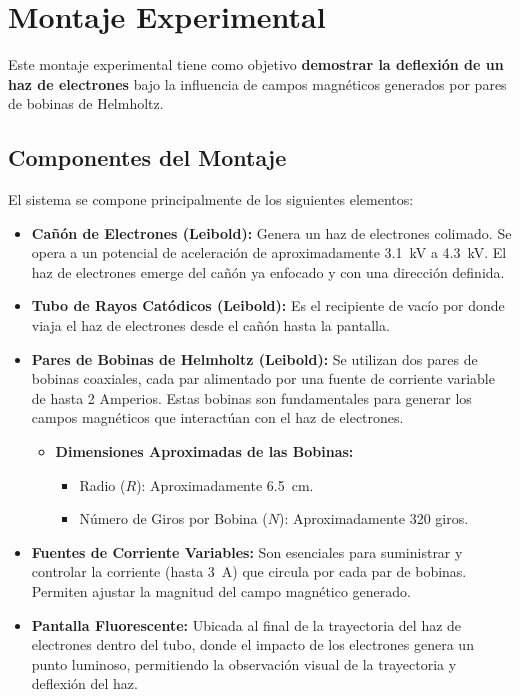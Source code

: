 \chapter{Montaje Experimental}
Este montaje experimental tiene como objetivo \textbf{demostrar la deflexión de
un haz de electrones} bajo la influencia de campos magnéticos generados por
pares de bobinas de Helmholtz.

\section{Componentes del Montaje}
El sistema se compone principalmente de los siguientes elementos:
\begin{itemize}
  \item \textbf{Cañón de Electrones (Leibold):} Genera un haz de electrones
    colimado. Se opera a un potencial de aceleración de aproximadamente
  \qty{3.1}{\kilo\volt} a \qty{4.3}{\kilo\volt}. El haz de electrones emerge del cañón ya enfocado
    y con una dirección definida.
  \item \textbf{Tubo de Rayos Catódicos (Leibold):} Es el recipiente de vacío
    por donde viaja el haz de electrones desde el cañón hasta la pantalla.
  \item \textbf{Pares de Bobinas de Helmholtz (Leibold):} Se utilizan dos pares
    de bobinas coaxiales, cada par alimentado por una fuente de
    corriente variable de hasta 2 Amperios. Estas bobinas son fundamentales
    para generar los campos magnéticos que interactúan con el haz de electrones.
    \begin{itemize}
      \item \textbf{Dimensiones Aproximadas de las Bobinas:}
        \begin{itemize}
        \item Radio ($R$): Aproximadamente \qty{6.5}{\centi\metre}.
          \item Número de Giros por Bobina ($N$): Aproximadamente 320 giros.
        \end{itemize}
    \end{itemize}
  \item \textbf{Fuentes de Corriente Variables:} Son esenciales para suministrar
    y controlar la corriente (hasta \qty{3}{\ampere}) que circula por cada par de bobinas.
    Permiten ajustar la magnitud del campo magnético generado.
  \item \textbf{Pantalla Fluorescente:} Ubicada al final de la trayectoria del
    haz de electrones dentro del tubo, donde el impacto de los electrones genera
    un punto luminoso, permitiendo la observación visual de la trayectoria y
    deflexión del haz.
\end{itemize}

